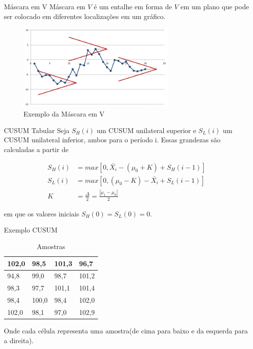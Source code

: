 \documentclass[12pt]{beamer}
\begin{document}
  \begin{frame}[t]{Máscara em V}
    Máscara em $V$ é um entalhe em forma de $V$ em um plano que pode ser colocado em diferentes localizações em um gráfico.

    \begin{figure}[ht]
      \includegraphics[width=0.7\textwidth]{img/grafico_CUSUM_mask_v}
      \caption{Exemplo da Máscara em V}
    \end{figure}
  \end{frame}

  \begin{frame}[t]{CUSUM Tabular}
    Seja $S_H(i)$ um CUSUM unilateral superior e $S_L(i)$ um CUSUM unilateral inferior, ambos para o período i. Essas grandezas são calculadas a partir de

    \begin{align*}
      S_H(i) & = max[0, \bar{X_i} - (\mu_0 + K) + S_H(i - 1)]\\
      S_L(i) & = max[0, (\mu_0 - K) - \bar{X_i} + S_L(i - 1)]\\
           K & = \frac{\Delta}{2} = \frac{|\mu_1 - \mu_0|}{2}
    \end{align*}

    em que os valores iniciais $S_H(0) = S_L(0) = 0$.
  \end{frame}

  \begin{frame}[t]{Exemplo CUSUM}
    \begin{table}[h]
      \centering

      \begin{tabular}{|l|l|l|l|}
        \hline
        102,0 & 98,5  & 101,3 & 96,7  \\ \hline
        94,8  & 99,0  & 98,7  & 101,2 \\ \hline
        98,3  & 97,7  & 101,1 & 101,4 \\ \hline
        98,4  & 100,0 & 98,4  & 102,0 \\ \hline
        102,0 & 98,1  & 97,0  & 102,9 \\ \hline
      \end{tabular}

      \caption{Amostras}
    \end{table}

    Onde cada célula representa uma amostra(de cima para baixo e da esquerda para a direita).
  \end{frame}
\end{document}
